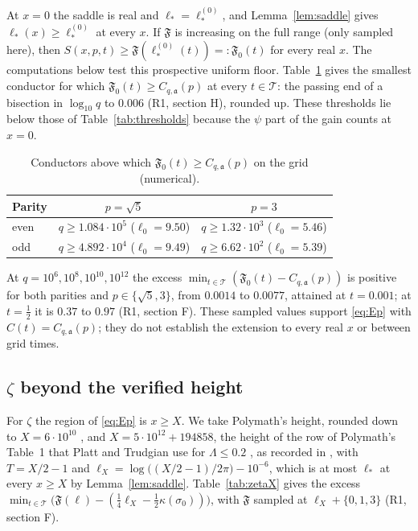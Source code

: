 \documentclass[11pt]{article}
\theoremstyle{definition}
\theoremstyle{remark}
\newcommand{\fa}{\mathfrak a}
\numberwithin{equation}{section}
\begin{document}
At $x=0$ the saddle is real and $\ell_*=\ell_*^{(0)}$, and
Lemma~\ref{lem:saddle} gives $\ell_*(x)\ge\ell_*^{(0)}$ at every $x$. If $\mathfrak F$ is increasing on the full range (only sampled here),
then $S(x,p,t)\ge\mathfrak F(\ell_*^{(0)}(t))=:\mathfrak F_0(t)$ for every
real $x$. The computations below test this prospective uniform floor. Table~\ref{tab:conductor} gives the smallest conductor
for which $\mathfrak F_0(t)\ge C_{q,\fa}(p)$ at every $t\in\mathcal T$:
the passing end of a bisection in $\log_{10}q$ to $0.006$ (R1, section H),
rounded up. These thresholds
lie below those of Table~\ref{tab:thresholds} because the $\psi$ part of
the gain counts at $x=0$.

\begin{table}[ht]
\centering\small
\begin{tabular}{@{}lcc@{}}
\toprule
Parity & $p=\sqrt5$ & $p=3$\\
\midrule
even & $q\ge1.084\cdot10^5$ ($\ell_0=9.50$) & $q\ge1.32\cdot10^3$ ($\ell_0=5.46$)\\
odd & $q\ge4.892\cdot10^4$ ($\ell_0=9.49$) & $q\ge6.62\cdot10^2$ ($\ell_0=5.39$)\\
\bottomrule
\end{tabular}
\caption{Conductors above which $\mathfrak F_0(t)\ge C_{q,\fa}(p)$ on the grid (numerical).}\label{tab:conductor}
\end{table}

At $q=10^6,10^8,10^{10},10^{12}$ the excess
$\min_{t\in\mathcal T}(\mathfrak F_0(t)-C_{q,\fa}(p))$ is positive for both
parities and $p\in\{\sqrt5,3\}$, from $0.0014$ to $0.0077$, attained at
$t=0.001$; at $t=\frac12$ it is $0.37$ to $0.97$ (R1, section F). These sampled values support \eqref{eq:Ep} with $C(t)=C_{q,\fa}(p)$;
they do not establish the extension to every real $x$ or between grid times.

\subsection{\texorpdfstring{$\zeta$}{Zeta} beyond the verified height}\label{sec:zetaX}

For $\zeta$ the region of \eqref{eq:Ep} is $x\ge X$. We take Polymath's
height, rounded down to $X=6\cdot10^{10}$ \cite{polymath}, and
$X=5\cdot10^{12}+194858$, the height of the row of Polymath's Table~1 that
Platt and Trudgian use for $\Lambda\le0.2$ \cite{platttrudgian}, as
recorded in \cite{n01}, with
$T=X/2-1$ and $\ell_X=\log\bigl((X/2-1)/2\pi\bigr)-10^{-6}$, which is at most
$\ell_*$ at every $x\ge X$ by Lemma~\ref{lem:saddle}. Table~\ref{tab:zetaX}
gives the excess
$\min_{t\in\mathcal T}\bigl(\mathfrak F(\ell)-(\frac14\ell_X-\frac12\kappa(\sigma_0))\bigr)$,
with $\mathfrak F$ sampled at $\ell_X+\{0,1,3\}$ (R1, section F).
\end{document}
